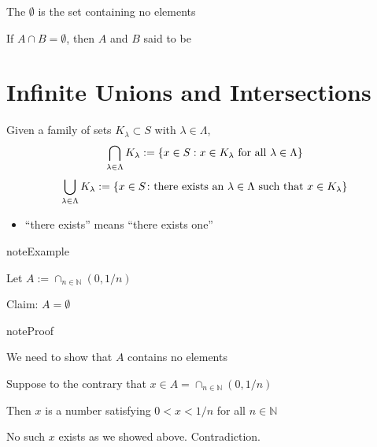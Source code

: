 \documentclass[letterpaper,10pt,english]{jupyterBook}
\begin{document}
\sphinxAtStartPar
The  \(\emptyset\) is the set containing no elements

\sphinxAtStartPar
If \(A \cap B = \emptyset\), then \(A\) and \(B\) said to be 


\section{Infinite Unions and Intersections}
\label{\detokenize{03.set_theory:infinite-unions-and-intersections}}
\sphinxAtStartPar
Given a family of sets \(K_{\lambda} \subset S\) with \(\lambda \in \Lambda\),
\begin{equation*}
\begin{split}
\bigcap_{\lambda \in \Lambda} K_{\lambda} 
:= \{ x \in S : x\in K_{\lambda}
\textnormal{ for all } \lambda \in \Lambda \}
\end{split}
\end{equation*}\begin{equation*}
\begin{split}
\bigcup_{\lambda \in \Lambda} K_{\lambda}  
:= \{x \in S \colon \textnormal{there
exists an } \lambda \in \Lambda \textnormal{ such that } x\in K_{\lambda} \}
\end{split}
\end{equation*}\begin{itemize}
\item {} 
\sphinxAtStartPar
“there exists” means “there exists  one”

\end{itemize}

\begin{sphinxadmonition}{note}{Example}

\sphinxAtStartPar
Let \(A := \cap_{n \in \mathbb{N}} (0, 1/n)\)

\sphinxAtStartPar
Claim: \(A = \emptyset\)
\end{sphinxadmonition}

\begin{sphinxadmonition}{note}{Proof}

\sphinxAtStartPar
We need to show that \(A\) contains no elements

\sphinxAtStartPar
Suppose to the contrary that \(x \in A = \cap_{n \in \mathbb{N}} (0, 1/n)\)

\sphinxAtStartPar
Then \(x\) is a number satisfying \(0 < x < 1/n\) for all \(n \in \mathbb{N}\)

\sphinxAtStartPar
No such \(x\) exists as we showed above. Contradiction.
\end{sphinxadmonition}
\end{document}
